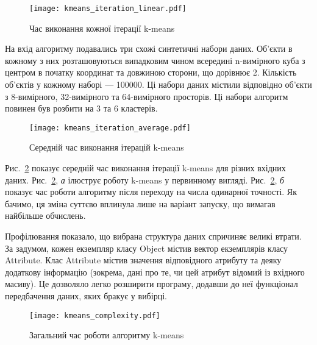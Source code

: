                 \begin{figure}
                    \centering
                    \texttt{[image: kmeans\_iteration\_linear.pdf]}
                    \caption{Час виконання кожної ітерації k-means}\label{fig:kmeans_linear}
                \end{figure}
                
                На вхід алгоритму подавались три схожі синтетичні набори даних. Об’єкти в кожному з них розташовуються випадковим чином всередині n-вимірного куба з центром в початку координат та довжиною сторони, що дорівнює 2. Кількість об’єктів у кожному наборі --- 100000. Ці набори даних містили відповідно об’єкти з 8-вимірного, 32-вимірного та 64-вимірного просторів. Ці набори алгоритм повинен був розбити на 3 та 6 кластерів.
                
                \begin{figure}
                    \centering
                    \texttt{[image: kmeans\_iteration\_average.pdf]}
                    \caption{Середній час виконання ітерацій k-means}\label{fig:kmeans_average}
                \end{figure}
                
                Рис.~\ref{fig:kmeans_average} показує середній час виконання ітерації k-means для різних вхідних даних. Рис.~\ref{fig:kmeans_average}, \emph{а} ілюструє роботу k-means у первинному вигляді. Рис.~\ref{fig:kmeans_average}, \emph{б} показує час роботи алгоритму після переходу на числа одинарної точності. Як бачимо, ця зміна суттєво вплинула лише на варіант запуску, що вимагав найбільше обчислень.
                
                Профілювання показало, що вибрана структура даних спричиняє великі втрати. За задумом, кожен екземпляр класу Object містив вектор екземплярів класу Attribute. Клас Attribute містив значення відповідного атрибуту та деяку додаткову інформацію (зокрема, дані про те, чи цей атрибут відомий із вхідного масиву). Це дозволяло легко розширити програму, додавши до неї функціонал передбачення даних, яких бракує у вибірці.
                
                \begin{figure}
                    \centering
                    \texttt{[image: kmeans\_complexity.pdf]}
                    \caption{Загальний час роботи алгоритму k-means}\label{fig:kmeans_complexity}
                \end{figure}
                
